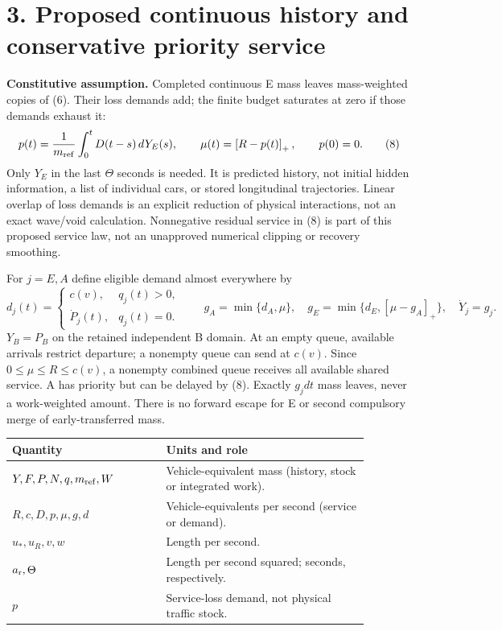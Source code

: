 \documentclass[11pt,a4paper]{article}
\newcommand{\pos}[1]{\left[#1\right]_+}
\begin{document}
\newpage
\section*{3. Proposed continuous history and conservative priority service}

\textbf{Constitutive assumption.} Completed continuous E mass leaves
mass-weighted copies of (6). Their loss demands add; the finite budget
saturates at zero if those demands exhaust it:
\begin{equation}
 p(t)=\frac{1}{m_{\rm ref}}\int_0^tD(t-s)\,dY_E(s),\qquad
 \mu(t)=\pos{R-p(t)},\qquad p(0)=0.
 \tag{8}
\end{equation}
Only $Y_E$ in the last $\Theta$ seconds is needed. It is predicted history,
not initial hidden information, a list of individual cars, or stored
longitudinal trajectories. Linear overlap of loss demands is an explicit
reduction of physical interactions, not an exact wave/void calculation.
Nonnegative residual service in (8) is part of this proposed service law,
not an unapproved numerical clipping or recovery smoothing.

For $j=E,A$ define eligible demand almost everywhere by
\begin{equation}
 d_j(t)=\begin{cases}c(v),&q_j(t)>0,\\
                          \dot P_j(t),&q_j(t)=0.
          \end{cases}\qquad
 g_A=\min\{d_A,\mu\},\quad
 g_E=\min\{d_E,\pos{\mu-g_A}\},\quad \dot Y_j=g_j.
 \tag{9}
\end{equation}
$Y_B=P_B$ on the retained independent B domain. At an empty queue,
available arrivals restrict departure; a nonempty queue can send at $c(v)$.
Since $0\leq\mu\leq R\leq c(v)$, a nonempty combined queue receives all
available shared service. A has priority but can be delayed by (8).
Exactly $g_jdt$ mass leaves, never a work-weighted amount. There is no
forward escape for E or second compulsory merge of early-transferred mass.

\begin{center}
\begin{tabular}{p{0.38\linewidth}p{0.5\linewidth}}
Quantity & Units and role\\ \hline
$Y,F,P,N,q,m_{\rm ref},W$ & Vehicle-equivalent mass (history, stock or integrated work).\\
$R,c,D,p,\mu,g,d$ & Vehicle-equivalents per second (service or demand).\\
$u_*,u_R,v,w$ & Length per second.\\
$a_{\rm r},\Theta$ & Length per second squared; seconds, respectively.\\
$p$ & Service-loss demand, not physical traffic stock.\\
\end{tabular}
\end{center}
\end{document}
